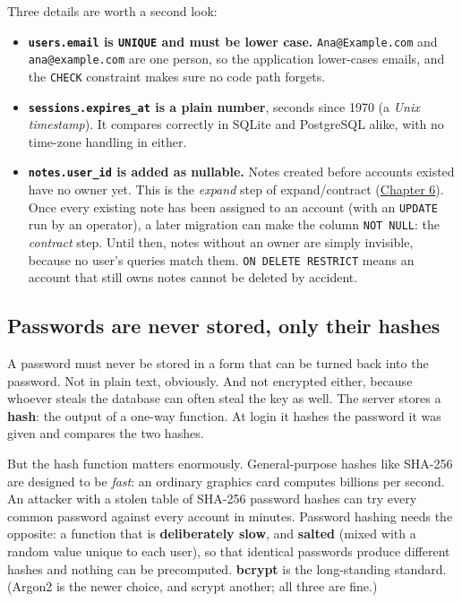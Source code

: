 \noindent{}Three details are worth a second look:

\begin{itemize}
\tightlist
\item
  \textbf{\texttt{users.email} is \texttt{UNIQUE} and must be lower case.} \texttt{Ana@Example.com} and \texttt{ana@example.com} are one person, so the application lower-cases emails, and the \texttt{CHECK} constraint makes sure no code path forgets.
\item
  \textbf{\texttt{sessions.expires\_at} is a plain number}, seconds since 1970 (a \emph{Unix timestamp}). It compares correctly in SQLite and PostgreSQL alike, with no time-zone handling in either.
\item
  \textbf{\texttt{notes.user\_id} is added as nullable.} Notes created before accounts existed have no owner yet. This is the \emph{expand} step of expand/contract (\hyperref[ch:06-local-dependencies]{Chapter 6}). Once every existing note has been assigned to an account (with an \texttt{UPDATE} run by an operator), a later migration can make the column \texttt{NOT\ NULL}: the \emph{contract} step. Until then, notes without an owner are simply invisible, because no user's queries match them. \texttt{ON\ DELETE\ RESTRICT} means an account that still owns notes cannot be deleted by accident.
\end{itemize}

\subsection*{Passwords are never stored, only their hashes}\label{38-security:passwords-are-never-stored-only-their-hashes}

A password must never be stored in a form that can be turned back into the password. Not in plain text, obviously. And not encrypted either, because whoever steals the database can often steal the key as well. The server stores a \textbf{hash}: the output of a one-way function. At login it hashes the password it was given and compares the two hashes.

But the hash function matters enormously. General-purpose hashes like SHA-256 are designed to be \emph{fast}: an ordinary graphics card computes billions per second. An attacker with a stolen table of SHA-256 password hashes can try every common password against every account in minutes. Password hashing needs the opposite: a function that is \textbf{deliberately slow}, and \textbf{salted} (mixed with a random value unique to each user), so that identical passwords produce different hashes and nothing can be precomputed. \textbf{bcrypt} is the long-standing standard. (Argon2 is the newer choice, and scrypt another; all three are fine.)


